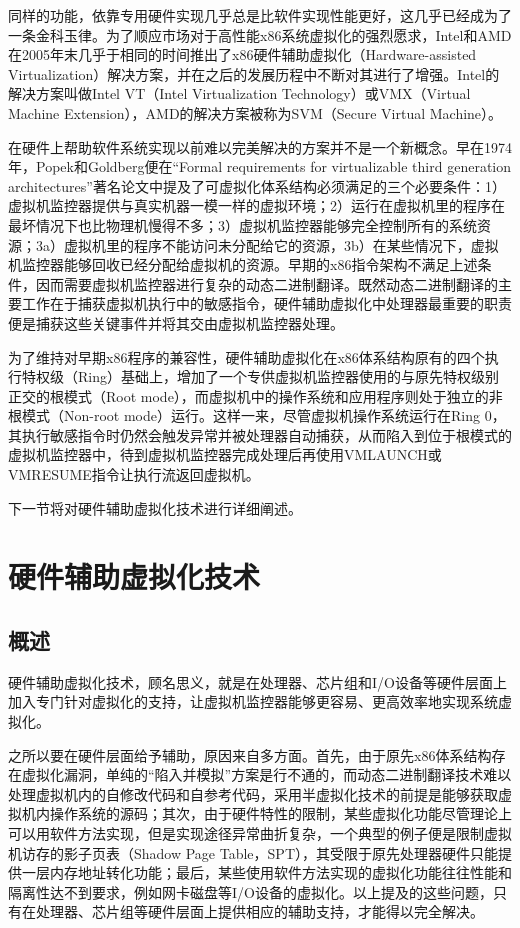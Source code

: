 同样的功能，依靠专用硬件实现几乎总是比软件实现性能更好，这几乎已经成为了一条金科玉律。为了顺应市场对于高性能x86系统虚拟化的强烈愿求，Intel和AMD在2005年末几乎于相同的时间推出了x86硬件辅助虚拟化（Hardware-assisted Virtualization）解决方案，并在之后的发展历程中不断对其进行了增强。Intel的解决方案叫做Intel VT（Intel Virtualization Technology）或VMX（Virtual Machine Extension），AMD的解决方案被称为SVM（Secure Virtual Machine）。

在硬件上帮助软件系统实现以前难以完美解决的方案并不是一个新概念。早在1974年，Popek和Goldberg便在``Formal requirements for virtualizable third generation architectures''著名论文中提及了可虚拟化体系结构必须满足的三个必要条件\cite{popek1974formal}：1）虚拟机监控器提供与真实机器一模一样的虚拟环境；2）运行在虚拟机里的程序在最坏情况下也比物理机慢得不多；3）虚拟机监控器能够完全控制所有的系统资源；3a）虚拟机里的程序不能访问未分配给它的资源，3b）在某些情况下，虚拟机监控器能够回收已经分配给虚拟机的资源。早期的x86指令架构不满足上述条件，因而需要虚拟机监控器进行复杂的动态二进制翻译。既然动态二进制翻译的主要工作在于捕获虚拟机执行中的敏感指令，硬件辅助虚拟化中处理器最重要的职责便是捕获这些关键事件并将其交由虚拟机监控器处理。

为了维持对早期x86程序的兼容性，硬件辅助虚拟化在x86体系结构原有的四个执行特权级（Ring）基础上，增加了一个专供虚拟机监控器使用的与原先特权级别正交的根模式（Root mode），而虚拟机中的操作系统和应用程序则处于独立的非根模式（Non-root mode）运行。这样一来，尽管虚拟机操作系统运行在Ring 0，其执行敏感指令时仍然会触发异常并被处理器自动捕获，从而陷入到位于根模式的虚拟机监控器中，待到虚拟机监控器完成处理后再使用VMLAUNCH或VMRESUME指令让执行流返回虚拟机。

下一节将对硬件辅助虚拟化技术进行详细阐述。

\section{硬件辅助虚拟化技术}

\subsection{概述}

硬件辅助虚拟化技术，顾名思义，就是在处理器、芯片组和I/O设备等硬件层面上加入专门针对虚拟化的支持，让虚拟机监控器能够更容易、更高效率地实现系统虚拟化。

之所以要在硬件层面给予辅助，原因来自多方面。首先，由于原先x86体系结构存在虚拟化漏洞，单纯的``陷入并模拟''方案是行不通的，而动态二进制翻译技术难以处理虚拟机内的自修改代码和自参考代码，采用半虚拟化技术的前提是能够获取虚拟机内操作系统的源码；其次，由于硬件特性的限制，某些虚拟化功能尽管理论上可以用软件方法实现，但是实现途径异常曲折复杂，一个典型的例子便是限制虚拟机访存的影子页表（Shadow Page Table，SPT），其受限于原先处理器硬件只能提供一层内存地址转化功能；最后，某些使用软件方法实现的虚拟化功能往往性能和隔离性达不到要求，例如网卡磁盘等I/O设备的虚拟化。以上提及的这些问题，只有在处理器、芯片组等硬件层面上提供相应的辅助支持，才能得以完全解决。

